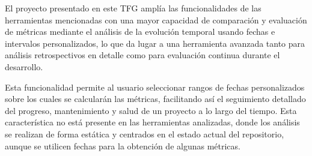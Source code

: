 \begin{table}[H]
	\centering
	\renewcommand{\arraystretch}{1.5}
	\caption{Comparación de herramientas y trabajos relacionados}
	\label{comparacion_trabajos}
\end{table}

El proyecto presentado en este TFG amplía las funcionalidades de las herramientas mencionadas con una mayor capacidad de comparación y evaluación de métricas mediante el análisis de la evolución temporal usando fechas e intervalos personalizados, lo que da lugar a una herramienta avanzada tanto para análisis retrospectivos en detalle como para evaluación continua durante el desarrollo.

Esta funcionalidad permite al usuario seleccionar rangos de fechas personalizados sobre los cuales se calcularán las métricas, facilitando así el seguimiento detallado del progreso, mantenimiento y salud de un proyecto a lo largo del tiempo. Esta característica no está presente en las herramientas analizadas, donde los análisis se realizan de forma estática y centrados en el estado actual del repositorio, aunque se utilicen fechas para la obtención de algunas métricas.

